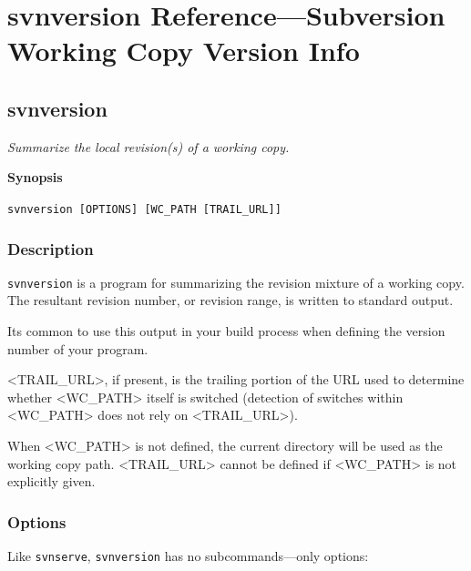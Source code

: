 \chapter{svnversion Reference---Subversion Working Copy Version
Info}\label{svn.ref.svnversion}

\section{svnversion}\label{svn.ref.svnversion.re}

\emph{Summarize the local revision(s) of a working copy.}

\textbf{Synopsis}

\texttt{svnversion\ {[}OPTIONS{]}\ {[}WC\_PATH\ {[}TRAIL\_URL{]}{]}}

\subsection{Description}\label{svn.ref.svnversion.re.desc}

\texttt{svnversion} is a program for summarizing the revision mixture of
a working copy. The resultant revision number, or revision range, is
written to standard output.

It\textquotesingle s common to use this output in your build process
when defining the version number of your program.

\textless TRAIL\_URL\textgreater, if present, is the trailing portion of
the URL used to determine whether \textless WC\_PATH\textgreater{}
itself is switched (detection of switches within
\textless WC\_PATH\textgreater{} does not rely on
\textless TRAIL\_URL\textgreater).

When \textless WC\_PATH\textgreater{} is not defined, the current
directory will be used as the working copy path.
\textless TRAIL\_URL\textgreater{} cannot be defined if
\textless WC\_PATH\textgreater{} is not explicitly given.

\subsection{Options}\label{svn.ref.svnversion.re.sw}

Like \texttt{svnserve}, \texttt{svnversion} has no subcommands---only
options:

